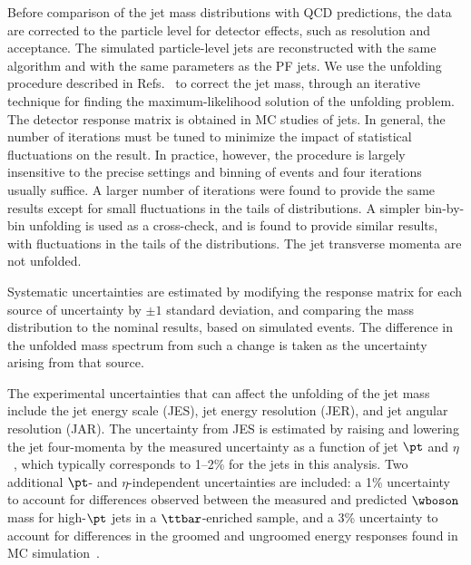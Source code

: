 \label{sec:systematics}

Before comparison of the jet mass distributions with QCD predictions, the data are
corrected to the particle level for detector effects, such as resolution and
acceptance. The simulated particle-level jets are
reconstructed with the same algorithm and with the same parameters as
the PF jets. We use the unfolding procedure described in
Refs.~\cite{unfolding_extra1,unfolding_extra2,unfolding_extra3,unfolding_extra4,agostini} 
to correct the jet mass, through
an iterative technique for finding the
maximum-likelihood solution of the unfolding problem.
The detector response matrix is obtained in MC studies of jets. 
In general, the number of iterations must be tuned to minimize the
impact of
statistical fluctuations on the result. In practice, however, the
procedure is largely insensitive to
the precise settings and binning of events and four iterations usually
suffice. A larger number of iterations were found to
provide the same results except for small fluctuations in the tails of
distributions. A simpler bin-by-bin unfolding is used as a
cross-check, 
and is found to provide similar results, with fluctuations
in the tails of the distributions. The jet transverse momenta are
not unfolded. 

Systematic uncertainties are estimated by modifying the 
response matrix for each source of uncertainty by $\pm 1$ standard
deviation, and comparing the mass
distribution to the nominal results, based on simulated \PYTHIA
events. The difference in the unfolded mass spectrum from such a change is taken as
the uncertainty arising from that source.


The experimental uncertainties that can affect the unfolding
of the jet mass
include the jet energy scale (JES),
jet energy resolution (JER), and jet angular resolution (JAR). 
The uncertainty from JES is estimated by raising and lowering the jet
four-momenta by the measured uncertainty as a function of jet $\pt$
and $\eta$~\cite{citeJEC}, which typically corresponds to 1--2\% for the jets
in this analysis. Two additional $\pt$- and $\eta$-independent
uncertainties are included: a 1\% uncertainty to account for
differences observed between the measured and
predicted $\wboson$ mass for high-$\pt$ jets in a $\ttbar$-enriched sample, and a
3\% uncertainty to account for differences in the groomed and
ungroomed energy responses found in MC simulation~\cite{EXO-11-006}. 

